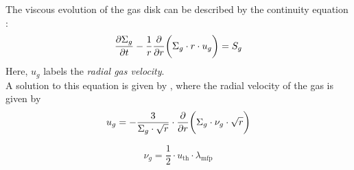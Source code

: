 
        The viscous evolution of the gas disk can be described by the continuity equation 
        \cite{birnstiel_dullemond_brauer_2010}:
        \begin{equation}
            \frac{\partial \Sigma_g}{\partial t}-\frac{1}{r}\frac{\partial }{\partial r}\bigg(\Sigma_g \cdot r \cdot u_g\bigg) = S_g
        \end{equation}
        Here, $u_g$ labels the \textit{radial gas velocity}.
        \\

        A solution to this equation is given by \cite{lynden-bell_pringle_1974}, where the 
        radial velocity of the gas is given by
        \begin{equation}
            u_{g}
            =-\frac{3}{\Sigma_g\cdot\sqrt{r}}
                \cdot\frac{\partial }{\partial r}\bigg(\Sigma_g \cdot \nu_g \cdot \sqrt{r}\bigg)
        \end{equation}

        \begin{equation}
            \nu_g = \frac{1}{2} \cdot u_\text{th} \cdot \lambda_\text{mfp}
        \end{equation}

        
